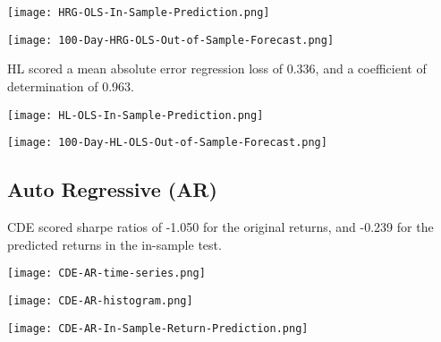 \begin{center}  
    \texttt{[image: HRG-OLS-In-Sample-Prediction.png]}
    \label{fig:nonfloat}
\end{center}

\begin{center}
    \texttt{[image: 100-Day-HRG-OLS-Out-of-Sample-Forecast.png]}
    \label{fig:nonfloat}
\end{center}

HL scored a mean absolute error regression loss of 0.336, and a coefficient of determination of 0.963.

\begin{center}  
    \texttt{[image: HL-OLS-In-Sample-Prediction.png]}
    \label{fig:nonfloat}
\end{center}

\begin{center}
    \texttt{[image: 100-Day-HL-OLS-Out-of-Sample-Forecast.png]}
    \label{fig:nonfloat}
\end{center}

\subsection{Auto Regressive (AR)}

CDE scored sharpe ratios of -1.050 for the original returns, and -0.239 for the predicted returns in the in-sample test.

\begin{center}
    \texttt{[image: CDE-AR-time-series.png]}
    \label{fig:nonfloat}
\end{center}

\begin{center}
    \texttt{[image: CDE-AR-histogram.png]}
    \label{fig:nonfloat}
\end{center}

\begin{center}
    \texttt{[image: CDE-AR-In-Sample-Return-Prediction.png]}
    \label{fig:nonfloat}
\end{center}

